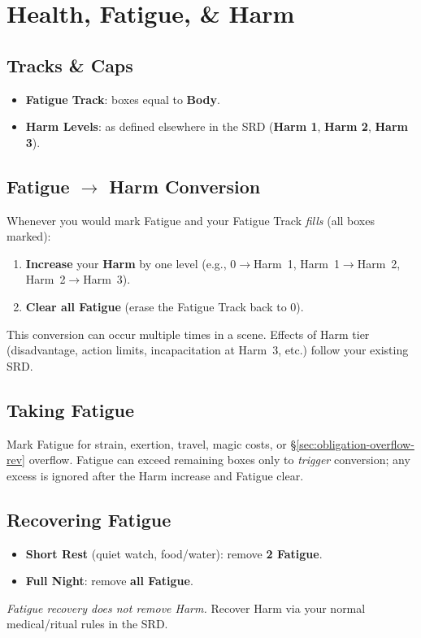 \section{Health, Fatigue, \& Harm} 
\label{sec:health-fatigue-harm-rev}

\subsection*{Tracks \& Caps}
\begin{itemize}
  \item \textbf{Fatigue Track}: boxes equal to \textbf{Body}.
  \item \textbf{Harm Levels}: as defined elsewhere in the SRD (\textbf{Harm 1}, \textbf{Harm 2}, \textbf{Harm 3}).
\end{itemize}

\subsection*{Fatigue $\rightarrow$ Harm Conversion}
Whenever you would mark Fatigue and your Fatigue Track \emph{fills} (all boxes marked):
\begin{enumerate}
  \item \textbf{Increase} your \textbf{Harm} by one level (e.g., 0$\rightarrow$Harm~1, Harm~1$\rightarrow$Harm~2, Harm~2$\rightarrow$Harm~3).
  \item \textbf{Clear all Fatigue} (erase the Fatigue Track back to 0).
\end{enumerate}
This conversion can occur multiple times in a scene. Effects of Harm tier (disadvantage, action limits, incapacitation at Harm~3, etc.) follow your existing SRD.

\subsection*{Taking Fatigue}
Mark Fatigue for strain, exertion, travel, magic costs, or \S\ref{sec:obligation-overflow-rev} overflow. Fatigue can exceed remaining boxes only to \emph{trigger} conversion; any excess is ignored after the Harm increase and Fatigue clear.

\subsection*{Recovering Fatigue}
\begin{itemize}
  \item \textbf{Short Rest} (quiet watch, food/water): remove \textbf{2 Fatigue}.
  \item \textbf{Full Night}: remove \textbf{all Fatigue}.
\end{itemize}
\emph{Fatigue recovery does not remove Harm.} Recover Harm via your normal medical/ritual rules in the SRD.

